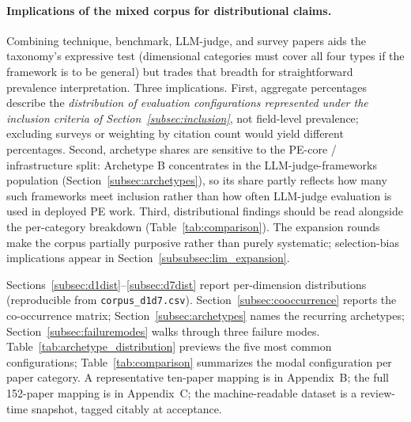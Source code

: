 \documentclass[acmsmall, nonacm, screen]{acmart}
\begin{document}
\paragraph{Implications of the mixed corpus for distributional claims.}
Combining technique, benchmark, LLM-judge, and survey papers aids the
taxonomy's expressive test (dimensional categories must cover all
four types if the framework is to be general) but trades that breadth
for straightforward prevalence interpretation. Three implications.
First, aggregate percentages describe the \emph{distribution of
evaluation configurations represented under the inclusion criteria of
Section~\ref{subsec:inclusion}}, not field-level prevalence; excluding
surveys or weighting by citation count would yield different
percentages. Second, archetype shares are sensitive to the PE-core /
infrastructure split: Archetype B concentrates in the
LLM-judge-frameworks population (Section~\ref{subsec:archetypes}), so
its share partly reflects how many such frameworks meet inclusion
rather than how often LLM-judge evaluation is used in deployed PE
work. Third, distributional findings should be read alongside the
per-category breakdown (Table~\ref{tab:comparison}). The expansion
rounds make the corpus partially purposive rather than purely
systematic; selection-bias implications appear in
Section~\ref{subsubsec:lim_expansion}.

Sections~\ref{subsec:d1dist}--\ref{subsec:d7dist} report per-dimension
distributions (reproducible from \texttt{corpus\_d1d7.csv}).
Section~\ref{subsec:cooccurrence} reports the co-occurrence matrix;
Section~\ref{subsec:archetypes} names the recurring archetypes;
Section~\ref{subsec:failuremodes} walks through three failure modes.
Table~\ref{tab:archetype_distribution} previews the five most common
configurations; Table~\ref{tab:comparison} summarizes the modal
configuration per paper category. A representative ten-paper mapping
is in Appendix~B; the full 152-paper mapping is in Appendix~C; the
machine-readable dataset is a review-time snapshot, tagged citably at
acceptance.
\end{document}
